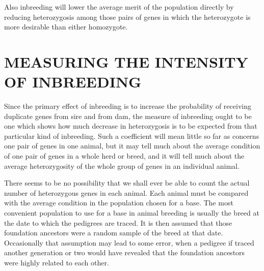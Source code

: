 Also inbreeding will lower the average merit of the population
directly by reducing heterozygosis among those pairs of genes in which
the heterozygote is more desirable than either homozygote.

\section*{MEASURING THE INTENSITY OF INBREEDING}

Since the primary effect of inbreeding is to increase the probability
of receiving duplicate genes from sire and from dam, the measure of
inbreeding ought to be one which shows how much decrease in heterozygosis
is to be expected from that particular kind of inbreeding. Such
a coefficient will mean little so far as concerns one pair of genes in one
animal, but it may tell much about the average condition of one pair of
genes in a whole herd or breed, and it will tell much about the average
heterozygosity of the whole group of genes in an individual animal.

There seems to be no possibility that we shall ever be able to count
the actual number of heterozygous genes in each animal. Each animal
must be compared with the average condition in the population chosen
for a base. The most convenient population to use for a base in animal
breeding is usually the breed at the date to which the pedigrees are
traced. It is then assumed that those foundation ancestors were a random
sample of the breed at that date. Occasionally that assumption
may lead to some error, when a pedigree if traced another generation or
two would have revealed that the foundation ancestors were highly
related to each other.

